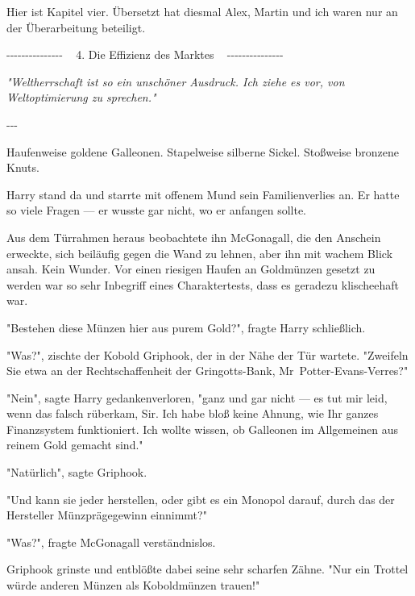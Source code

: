 

\hypertarget{die-effizienz-des-marktes}{%

Hier ist Kapitel vier. Übersetzt hat diesmal Alex, Martin und ich waren nur an der Überarbeitung beteiligt.

-\/-\/-\/-\/-\/-\/-\/-\/-\/-\/-\/-\/-\/-\/- ~ 4. Die Effizienz des Marktes ~ -\/-\/-\/-\/-\/-\/-\/-\/-\/-\/-\/-\/-\/-\/-

\emph{"Weltherrschaft ist so ein unschöner Ausdruck. Ich ziehe es vor, von Weltoptimierung zu sprechen."}

-\/-\/-

Haufenweise goldene Galleonen. Stapelweise silberne Sickel. Stoßweise bronzene Knuts.

Harry stand da und starrte mit offenem Mund sein Familienverlies an. Er hatte so viele Fragen --- er wusste gar nicht, wo er anfangen sollte.

Aus dem Türrahmen heraus beobachtete ihn McGonagall, die den Anschein erweckte, sich beiläufig gegen die Wand zu lehnen, aber ihn mit wachem Blick ansah. Kein Wunder. Vor einen riesigen Haufen an Goldmünzen gesetzt zu werden war so sehr Inbegriff eines Charaktertests, dass es geradezu klischeehaft war.

"Bestehen diese Münzen hier aus purem Gold?", fragte Harry schließlich.

"Was?", zischte der Kobold Griphook, der in der Nähe der Tür wartete. "Zweifeln Sie etwa an der Rechtschaffenheit der Gringotts-Bank, Mr~Potter-Evans-Verres?"

"Nein", sagte Harry gedankenverloren, "ganz und gar nicht --- es tut mir leid, wenn das falsch rüberkam, Sir. Ich habe bloß keine Ahnung, wie Ihr ganzes Finanzsystem funktioniert. Ich wollte wissen, ob Galleonen im Allgemeinen aus reinem Gold gemacht sind."

"Natürlich", sagte Griphook.

"Und kann sie jeder herstellen, oder gibt es ein Monopol darauf, durch das der Hersteller Münzprägegewinn einnimmt?"

"Was?", fragte McGonagall verständnislos.

Griphook grinste und entblößte dabei seine sehr scharfen Zähne. "Nur ein Trottel würde anderen Münzen als Koboldmünzen trauen!"

}
